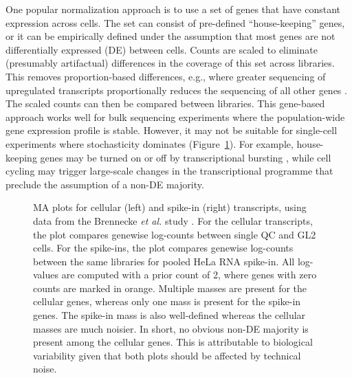 \documentclass{article}
\begin{document}
One popular normalization approach is to use a set of genes that have constant expression across cells.
The set can consist of pre-defined ``house-keeping'' genes, or it can be empirically defined under the assumption that most genes are not differentially expressed (DE) between cells.
Counts are scaled to eliminate (presumably artifactual) differences in the coverage of this set across libraries.
This removes proportion-based differences, e.g., where greater sequencing of upregulated transcripts proportionally reduces the sequencing of all other genes \cite{robinson2010tmm}.
The scaled counts can then be compared between libraries.
This gene-based approach works well for bulk sequencing experiments where the population-wide gene expression profile is stable.
However, it may not be suitable for single-cell experiments where stochasticity dominates (Figure~\ref{fig:maexample}).
For example, house-keeping genes may be turned on or off by transcriptional bursting \cite{marinov2014singlecell}, while cell cycling may trigger large-scale changes in the transcriptional programme that preclude the assumption of a non-DE majority.

\begin{figure}[H]
\begin{center}
\end{center}
\caption{MA plots for cellular (left) and spike-in (right) transcripts, using data from the Brennecke \emph{et al.} study \cite{brennecke2013accounting}.
For the cellular transcripts, the plot compares genewise log-counts between single QC and GL2 cells.
For the spike-ins, the plot compares genewise log-counts between the same libraries for pooled HeLa RNA spike-in.
All log-values are computed with a prior count of 2, where genes with zero counts are marked in orange.
Multiple masses are present for the cellular genes, whereas only one mass is present for the spike-in genes.
The spike-in mass is also well-defined whereas the cellular masses are much noisier.
In short, no obvious non-DE majority is present among the cellular genes.
This is attributable to biological variability given that both plots should be affected by technical noise.
}
\label{fig:maexample}
\end{figure}
\end{document}
